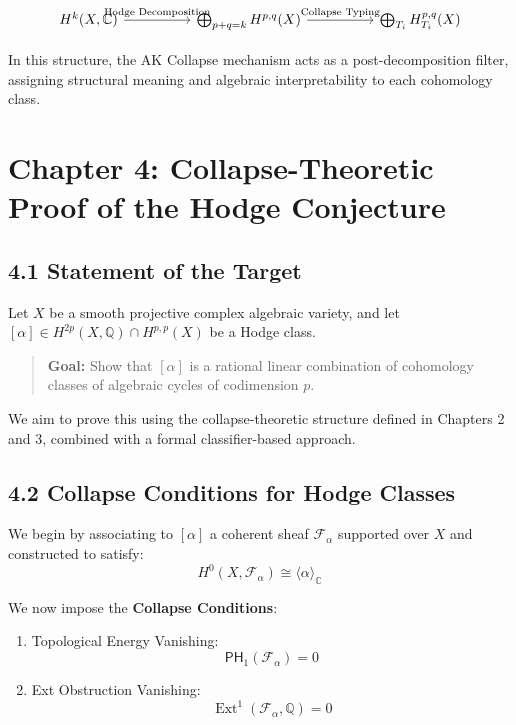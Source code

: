 \documentclass[11pt]{article}
\DeclareMathOperator{\Ext}{Ext}
\begin{document}
\[
\begin{tikzcd}[row sep=large, column sep=huge]
H^k(X, \mathbb{C}) \arrow[r, "\text{Hodge Decomposition}"]
& \bigoplus_{p+q=k} H^{p,q}(X) \arrow[r, "\text{Collapse Typing}"]
& \bigoplus_{T_i} H^{p,q}_{T_i}(X)
\end{tikzcd}
\]

In this structure, the AK Collapse mechanism acts as a post-decomposition filter,
assigning structural meaning and algebraic interpretability to each cohomology class.



\section{Chapter 4: Collapse-Theoretic Proof of the Hodge Conjecture}

\subsection{4.1 Statement of the Target}

Let $X$ be a smooth projective complex algebraic variety, and let $[\alpha] \in H^{2p}(X, \mathbb{Q}) \cap H^{p,p}(X)$ be a Hodge class.

\begin{quote}
\textbf{Goal:}  
Show that $[\alpha]$ is a rational linear combination of cohomology classes of algebraic cycles of codimension $p$.
\end{quote}

We aim to prove this using the collapse-theoretic structure defined in Chapters 2 and 3, combined with a formal classifier-based approach.

\subsection{4.2 Collapse Conditions for Hodge Classes}

We begin by associating to $[\alpha]$ a coherent sheaf $\mathcal{F}_\alpha$ supported over $X$ and constructed to satisfy:
\[
H^0(X, \mathcal{F}_\alpha) \cong \langle \alpha \rangle_\mathbb{C}
\]

We now impose the \textbf{Collapse Conditions}:

\begin{enumerate}
  \item Topological Energy Vanishing:
  \[
  \mathsf{PH}_1(\mathcal{F}_\alpha) = 0
  \]
  \item Ext Obstruction Vanishing:
  \[
  \Ext^1(\mathcal{F}_\alpha, \mathbb{Q}) = 0
  \]
\end{enumerate}
\end{document}
